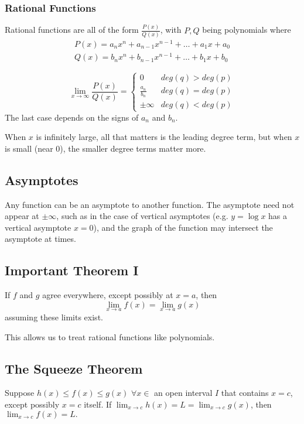 \documentclass{article}
\begin{document}
\subsubsection{Rational Functions}
Rational functions are all of the form $\frac{P(x)}{Q(x)}$, with $P, Q$ being polynomials where
\begin{align*}
    P(x) = a_nx^n + a_{n-1}x^{n-1} + \ldots + a_1x + a_0 \\
    Q(x) = b_nx^n + b_{n-1}x^{n-1} + \ldots + b_1x + b_0
\end{align*}

$$\lim_{x\to\infty}\frac{P(x)}{Q(x)} = \begin{cases}
    0 & deg(q) > deg(p) \\
    \frac{a_n}{b_n} & deg(q) = deg(p)\\
    \pm \infty & deg(q) < deg(p)
\end{cases}$$
The last case depends on the signs of $a_n$ and $b_n$.

When $x$ is infinitely large, all that matters is the leading degree term, but when $x$ is small (near $0$), the smaller degree terms matter more.

\subsection{Asymptotes}
Any function can be an asymptote to another function. The asymptote need not appear at $\pm\infty$, such as in the case of vertical asymptotes (e.g. $y=\log{x}$ has a vertical asymptote $x=0$), and the graph of the function may intersect the asymptote at times.

\subsection{Important Theorem I}
If $f$ and $g$ agree everywhere, except possibly at $x=a$, then \[ \lim_{x \to a} f(x) = \lim_{x \to a} g(x) \] assuming these limits exist.

This allows us to treat rational functions like polynomials.

\subsection{The Squeeze Theorem}
Suppose $h(x) \le f(x) \le g(x)$ $\forall x \in$ an open interval $I$ that contains $x=c$, except possibly $x=c$ itself. If $\lim_{x\to c}\limits h(x) = L = \lim_{x\to c}\limits g(x)$, then $\lim_{x \to c}f(x) = L.$
\end{document}
